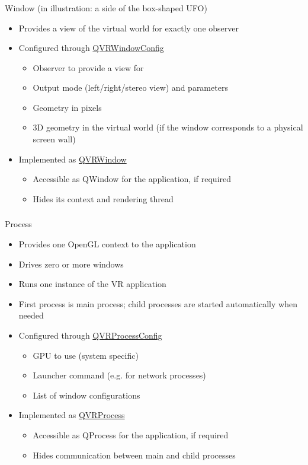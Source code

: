 \documentclass[utf8,stillsansserifmath,fleqn,t]{beamer}
\begin{document}
\begin{frame}
\frametitle{\insertsection}
Window (in illustration: a side of the box-shaped UFO)
\begin{itemize}
\item Provides a view of the virtual world for exactly one observer
\item Configured through \href{https://marlam.de/qvr/libqvr-reference/class_q_v_r_window_config.html}{QVRWindowConfig}
    \begin{itemize}
    \item Observer to provide a view for
    \item Output mode (left/right/stereo view) and parameters
    \item Geometry in pixels
    \item 3D geometry in the virtual world
        (if the window corresponds to a physical screen wall)
    \end{itemize}
\item Implemented as \href{https://marlam.de/qvr/libqvr-reference/class_q_v_r_window.html}{QVRWindow}
    \begin{itemize}
    \item Accessible as QWindow for the application, if required
    \item Hides its context and rendering thread
    \end{itemize}
\end{itemize}
\end{frame}

\begin{frame}
\frametitle{\insertsection}
Process
\begin{itemize}
\item Provides one OpenGL context to the application
\item Drives zero or more windows
\item Runs one instance of the VR application
\item First process is main process; child processes are started automatically
when needed
\item Configured through \href{https://marlam.de/qvr/libqvr-reference/class_q_v_r_process_config.html}{QVRProcessConfig}
    \begin{itemize}
    \item GPU to use (system specific)
    \item Launcher command (e.g. for network processes)
    \item List of window configurations
    \end{itemize}
\item Implemented as \href{https://marlam.de/qvr/libqvr-reference/class_q_v_r_process.html}{QVRProcess}
    \begin{itemize}
    \item Accessible as QProcess for the application, if required
    \item Hides communication between main and child processes
    \end{itemize}
\end{itemize}
\end{frame}
\end{document}
